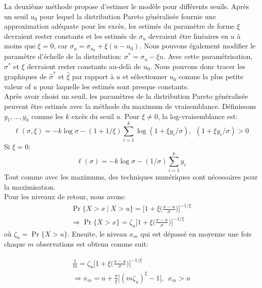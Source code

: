 La deuxième méthode propose d'estimer le modèle pour différents seuils. Après un seuil $u_0$ pour lequel la distribution Pareto généralisée fournie une approximation adéquate pour les excès, les estimés du paramètre de forme $\xi$ devraient rester constants et les estimés de $\sigma_u$ devraient être linéaires en $u$ à moins que $\xi =0$, car $\sigma_u = \sigma_{u_0} + \xi(u - u_0)$. Nous pouvons également modifier le paramètre d'échelle de la distribution: $\sigma^* = \sigma_u - \xi u$. Avec cette paramétrisation, $\sigma^*$ et $\xi$ devraient rester constants au-delà de $u_0$. Nous pouvons donc tracer les graphiques de $\hat\sigma^*$ et $\hat\xi$ par rapport à $u$ et sélectionner $u_0$ comme la plus petite valeur of $u$ pour laquelle les estimés sont presque constants.\\ 

Après avoir choisi un seuil, les paramètres de la distribution Pareto généralisée peuvent être estimés avec la méthode du maximum de vraisemblance. Définissons $y_1,\dots,y_k$ comme les $k$ excès du seuil $u$. Pour $\xi \ne 0$, la log-vraisemblance est:
\begin{equation}\label{eq:1.2.6}
{\ell(\sigma, \xi) = -k\log\sigma - (1+1/\xi)\sum_{i=1}^{k}\log(1+\xi{y_i}/\sigma),\ \ (1+\xi{y_i}/\sigma) >0}
\end{equation}
Si $\xi =0$:
\begin{equation}\label{eq:1.2.7}
{\ell(\sigma) = -k\log\sigma - (1/\sigma)\sum_{i=1}^{k}y_i}
\end{equation}
Tout comme avec les maximums, des techniques numériques sont nécessaires pour la maximisation.\\

Pour les niveaux de retour, nous avons:
\begin{equation}\label{eq:1.2.8}
\begin{split}
{\Pr\{ X>x\ |\ X>u\} = \Big[ 1 + \xi \Big( \frac{x-u}{\sigma}\Big)\Big]^{-1/\xi}}\\
{\Rightarrow \Pr\{X>x\} = \zeta_u \Big[1 + \xi \Big( \frac{x-u}{\sigma}\Big)\Big]^{-1/\xi}}
\end{split}
\end{equation}
où $\zeta_u = \Pr\{X>u\}$. Ensuite, le niveau $x_m$ qui est dépassé en moyenne une fois chaque $m$ observations est obtenu comme suit:

\begin{equation}\label{eq:1.2.9}
\begin{split}
{\frac{1}{m} = \zeta_u \Big[1 + \xi \Big( \frac{x-u}{\sigma}\Big)\Big]^{-1/\xi}}\\
{\Rightarrow x_m = u + \frac{\sigma}{\xi} \Big[(m\zeta_u)^\xi -1\Big],\ \ x_m>u}
\end{split}
\end{equation}

